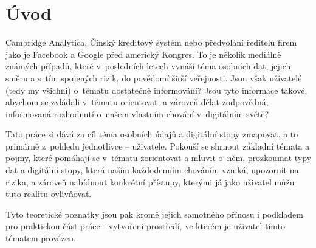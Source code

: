 \chapter*{Úvod}
\pagestyle{plain}

Cambridge Analytica, Čínský kreditový systém nebo předvolání ředitelů firem jako je Facebook a Google před americký Kongres. To je několik mediálně známých případů, které v~posledních letech vynáší téma osobních dat, jejich směru a s~tím spojených rizik, do povědomí širší veřejnosti.
Jsou však uživatelé (tedy my všichni) o~tématu dostatečně informováni? Jsou tyto informace takové, abychom se zvládali v~tématu orientovat, a zároveň dělat zodpovědná, informovaná rozhodnutí o~našem vlastním chování v~digitálním světě?

Tato práce si dává za cíl téma osobních údajů a digitální stopy zmapovat, a to primárně z~pohledu jednotlivce -- uživatele. Pokouší se shrnout základní témata a pojmy, které pomáhají se v~tématu zorientovat a mluvit o~něm, prozkoumat typy dat a digitální stopy, která naším každodenním chováním vzniká, upozornit na rizika, a zároveň nabídnout konkrétní přístupy, kterými já jako uživatel můžu tuto realitu ovlivňovat.

Tyto teoretické poznatky jsou pak kromě jejich samotného přínosu i podkladem pro praktickou část práce - vytvoření prostředí, ve kterém je uživatel tímto tématem provázen. 
